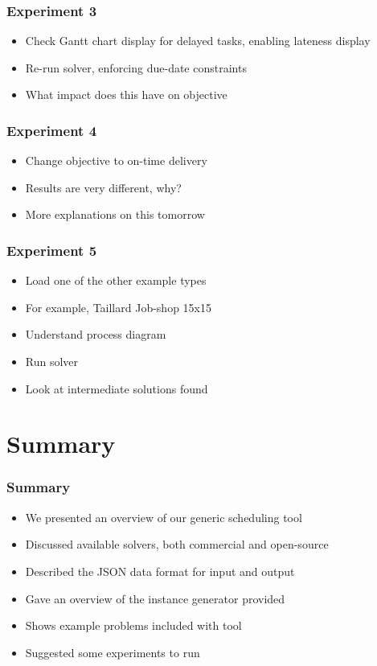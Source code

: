 \begin{frame}
\frametitle{Experiment 3}
\begin{itemize}
\item Check Gantt chart display for delayed tasks, enabling lateness display
\item Re-run solver, enforcing due-date constraints
\item What impact does this have on objective
\end{itemize}
\end{frame}

\begin{frame}
\frametitle{Experiment 4}
\begin{itemize}
\item Change objective to on-time delivery
\item Results are very different, why?
\item More explanations on this tomorrow
\end{itemize}
\end{frame}

\begin{frame}
\frametitle{Experiment 5}
\begin{itemize}
\item Load one of the other example types
\item For example, Taillard Job-shop 15x15
\item Understand process diagram
\item Run solver
\item Look at intermediate solutions found
\end{itemize}
\end{frame}










\section{Summary}

\begin{frame}
\frametitle{Summary}
\begin{itemize}
\item We presented an overview of our generic scheduling tool
\item Discussed available solvers, both commercial and open-source
\item Described the JSON data format for input and output
\item Gave an overview of the instance generator provided
\item Shows example problems included with tool
\item Suggested some experiments to run
\end{itemize}
\end{frame}

